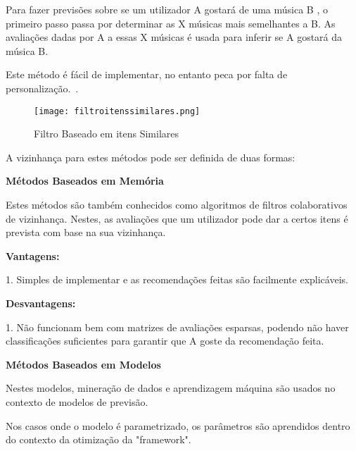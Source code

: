\hfill

 \par Para fazer previsões sobre se um utilizador A gostará de uma música B , o primeiro passo passa por determinar as X músicas mais semelhantes a B. As avaliações dadas por A a essas X músicas é usada para inferir se A gostará da música B.

 \par Este método é fácil de implementar, no entanto peca por falta de personalização.~\cite{ref_article1}.

\begin{figure}[H]

  \centering

  \texttt{[image: filtroitenssimilares.png]}

  \caption{Filtro Baseado em itens Similares}

  \label{fig02}

\end{figure}
\par A vizinhança para estes métodos pode ser definida de duas formas:



\begin{center}
\normalsize{\bfseries Métodos Baseados em Memória}\hfill
\end{center}

 \par Estes métodos são também conhecidos como algoritmos de filtros colaborativos de vizinhança. Nestes, as avaliações que um utilizador pode dar a certos itens é prevista com base na sua vizinhança.\newline

\textbf{Vantagens:}\hfill
\hfill
\par 1. Simples de implementar e as recomendações feitas são facilmente explicáveis.\newline

\textbf{Desvantagens:}\hfill
\hfill
\par 1. Não funcionam bem com matrizes de avaliações esparsas, podendo não haver classificações suficientes para garantir que A goste da recomendação feita.\newline

\begin{center}
\normalsize{\bfseries Métodos Baseados em Modelos}\hfill
\end{center}
\hfill
\par Nestes modelos, mineração de dados e aprendizagem máquina são usados no contexto de modelos de previsão.
\par Nos casos onde o modelo é parametrizado, os parâmetros são aprendidos dentro do contexto da otimização da "framework".





